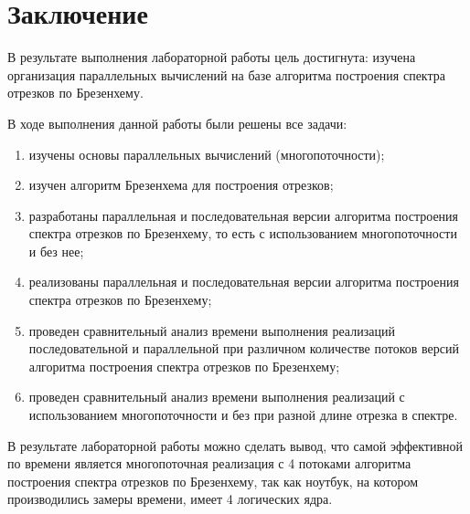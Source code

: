 \chapter*{Заключение}

В результате выполнения лабораторной работы цель достигнута: изучена организация параллельных вычислений на базе алгоритма построения спектра отрезков по Брезенхему.

В ходе выполнения данной работы были решены все задачи:

\begin{enumerate}[label={\arabic*)}]
    \item изучены основы параллельных вычислений (многопоточности);
    \item изучен алгоритм Брезенхема для построения отрезков;
	\item разработаны параллельная и последовательная версии алгоритма построения спектра отрезков по Брезенхему, то есть с использованием многопоточности и без нее;
	\item реализованы параллельная и последовательная версии алгоритма построения спектра отрезков по Брезенхему;
	\item проведен сравнительный анализ времени выполнения реализаций последовательной и параллельной при различном количестве потоков версий алгоритма построения спектра отрезков по Брезенхему;	
	\item проведен сравнительный анализ времени выполнения реализаций с использованием многопоточности и без при разной длине отрезка в спектре.
\end{enumerate}

В результате лабораторной работы можно сделать вывод, что самой эффективной по времени является многопоточная реализация с 4 потоками алгоритма построения спектра отрезков по Брезенхему, так как ноутбук, на котором производились замеры времени, имеет 4 логических ядра.
